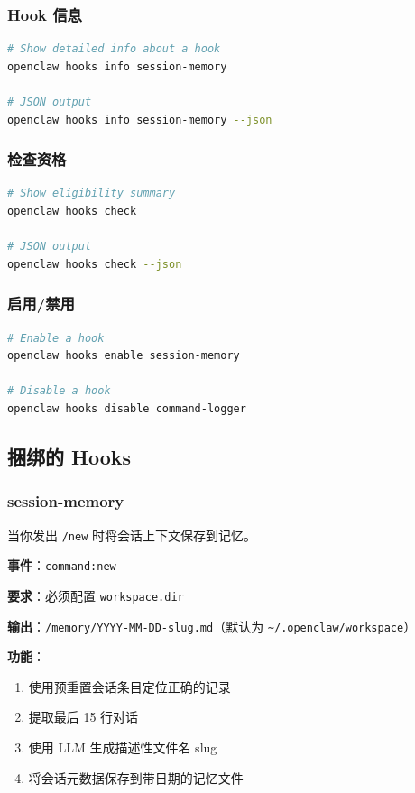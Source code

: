 \subsubsection{Hook 信息}


\begin{lstlisting}[language=bash]
# Show detailed info about a hook
openclaw hooks info session-memory

# JSON output
openclaw hooks info session-memory --json
\end{lstlisting}


\subsubsection{检查资格}


\begin{lstlisting}[language=bash]
# Show eligibility summary
openclaw hooks check

# JSON output
openclaw hooks check --json
\end{lstlisting}


\subsubsection{启用/禁用}


\begin{lstlisting}[language=bash]
# Enable a hook
openclaw hooks enable session-memory

# Disable a hook
openclaw hooks disable command-logger
\end{lstlisting}


\subsection{捆绑的 Hooks}


\subsubsection{session-memory}


当你发出 \texttt{/new} 时将会话上下文保存到记忆。

\textbf{事件}：\texttt{command:new}

\textbf{要求}：必须配置 \texttt{workspace.dir}

\textbf{输出}：\texttt{/memory/YYYY-MM-DD-slug.md}（默认为 \texttt{\textasciitilde{}/.openclaw/workspace}）

\textbf{功能}：

\begin{enumerate}
  \item 使用预重置会话条目定位正确的记录
  \item 提取最后 15 行对话
  \item 使用 LLM 生成描述性文件名 slug
  \item 将会话元数据保存到带日期的记忆文件
\end{enumerate}


